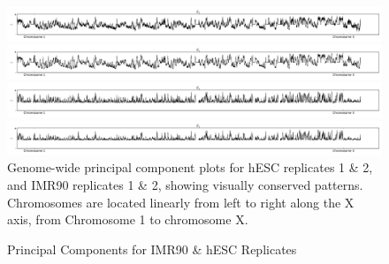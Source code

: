 \begin{figure}[H]
  \centering
  \caption{Principal Components for IMR90 \& hESC Replicates}
  \includegraphics[width=\textwidth]{./figures/supplementary/components/hESC-R1.png}
  \vfill
  \includegraphics[width=\textwidth]{./figures/supplementary/components/hESC-R2.png}
  \vfill
  \includegraphics[width=\textwidth]{./figures/supplementary/components/IMR90-R1.png}
  \vfill
  \includegraphics[width=\textwidth]{./figures/supplementary/components/IMR90-R2.png}
  \medskip
  \small
  Genome-wide principal component plots for hESC replicates 1 \& 2, and IMR90 replicates 1 \& 2, showing
  visually conserved patterns.  Chromosomes are located linearly from left to right along the X axis,
  from Chromosome 1 to chromosome X.
\end{figure}
